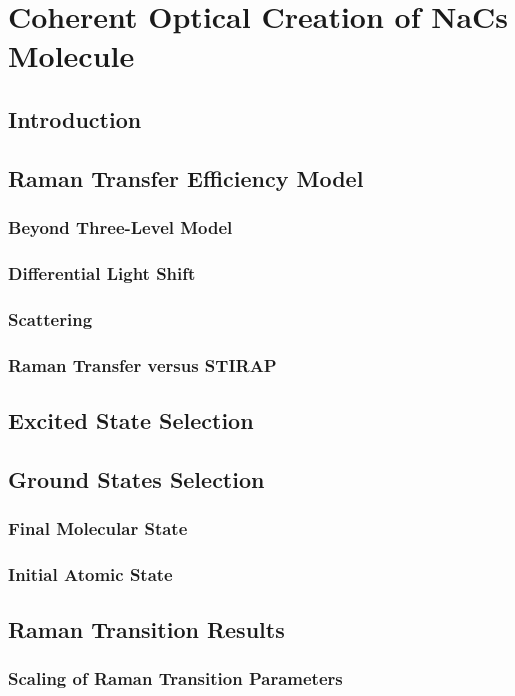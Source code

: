
\chapter{Coherent Optical Creation of NaCs Molecule}
\label{ch:raman-transfer}

\section{Introduction}

\section{Raman Transfer Efficiency Model}

\subsection{Beyond Three-Level Model}

\subsection{Differential Light Shift}

\subsection{Scattering}

\subsection{Raman Transfer versus STIRAP}

\section{Excited State Selection}

\section{Ground States Selection}

\subsection{Final Molecular State}

\subsection{Initial Atomic State}

\section{Raman Transition Results}

\subsection{Scaling of Raman Transition Parameters}
